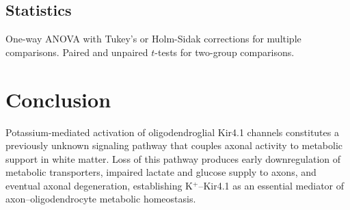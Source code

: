 \documentclass[11pt]{article}
\begin{document}
\subsection{Statistics}
One-way ANOVA with Tukey's or Holm-Sidak corrections for multiple comparisons. Paired and unpaired $t$-tests for two-group comparisons.

\section{Conclusion}

Potassium-mediated activation of oligodendroglial Kir4.1 channels constitutes a previously unknown signaling pathway that couples axonal activity to metabolic support in white matter. Loss of this pathway produces early downregulation of metabolic transporters, impaired lactate and glucose supply to axons, and eventual axonal degeneration, establishing K$^+$--Kir4.1 as an essential mediator of axon--oligodendrocyte metabolic homeostasis.



\end{document}
